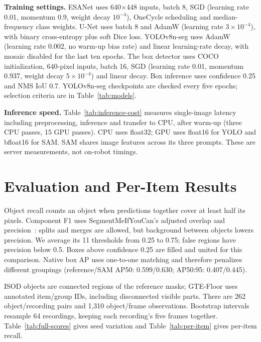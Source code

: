 \textbf{Training settings.} ESANet uses 640$\times$448 inputs, batch 8,
SGD (learning rate 0.01, momentum 0.9, weight decay $10^{-4}$), OneCycle
scheduling and median-frequency class weights. U-Net uses batch 8 and
AdamW (learning rate $3\times10^{-4}$), with binary cross-entropy plus
soft Dice loss. YOLOv8n-seg uses AdamW (learning rate 0.002, no warm-up
bias rate) and linear learning-rate decay, with mosaic disabled for the
last ten epochs. The box detector uses COCO initialization, 640-pixel
inputs, batch 16, SGD (learning rate 0.01, momentum 0.937, weight decay
$5\times10^{-4}$) and linear decay. Box inference uses confidence 0.25
and NMS IoU 0.7. YOLOv8n-seg checkpoints are checked every five epochs;
selection criteria are in Table~\ref{tab:models}.

\textbf{Inference speed.} Table~\ref{tab:inference-cost} measures single-image
latency including preprocessing, inference and transfer to CPU, after
warm-up (three CPU passes, 15 GPU passes). CPU uses float32; GPU uses
float16 for YOLO and bfloat16 for SAM. SAM shares image features across
its three prompts. These are server measurements, not on-robot timings.



\clearpage
\section{Evaluation and Per-Item Results}\label{app:evaluation}

Object recall counts an object when predictions together cover at least
half its pixels. Component F1 uses SegmentMeIfYouCan's adjusted overlap
and precision~\cite{chan2021segment}: splits and merges are allowed, but
background between objects lowers precision. We average its 11
thresholds from 0.25 to 0.75; false regions have precision below 0.5.
Boxes above confidence 0.25 are filled and united for this comparison.
Native box AP uses one-to-one matching and therefore penalizes different
groupings (reference/SAM AP50: 0.599/0.630; AP50:95: 0.407/0.445).

ISOD objects are connected regions of the reference masks; GTE-Floor
uses annotated item/group IDs, including disconnected visible parts.
There are 262 object/recording pairs and 1,310 object/frame observations.
Bootstrap intervals resample 64 recordings, keeping each recording's
five frames together. Table~\ref{tab:full-scores} gives seed variation
and Table~\ref{tab:per-item} gives per-item recall.

